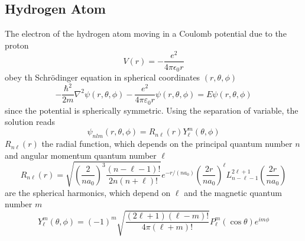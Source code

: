 \documentclass[../../../main.tex]{subfiles}
\begin{document}
  \subsection{Hydrogen Atom}
  The electron of the hydrogen atom  moving in a Coulomb potential due to the proton
  \begin{equation*}
    V(r) = - \frac{e^2}{4 \pi \epsilon_0 r}
  \end{equation*}
  obey th Schrödinger equation in spherical coordinates $(r,\theta,\phi)$
  \begin{equation*}
    -\frac{\hbar^{2}}{2m}\nabla^{2}\psi(r, \theta, \phi) - \frac{e^{2}}{4\pi\varepsilon_{0}r}\psi(r, \theta, \phi) = E\psi(r, \theta, \phi)
  \end{equation*}
  since the potential is spherically symmetric.
  Using the separation of variable, the solution reads
  \begin{equation*}
    \psi_{nlm}(r, \theta, \phi) = R_{n\ell}(r) Y_{\ell}^{m}(\theta, \phi)
  \end{equation*}
$R_{n\ell}(r)$ the radial function, which depends on the principal quantum number $n$ and angular momentum quantum number $\ell$
  \begin{equation*}
    R_{n\ell}(r) = \sqrt{\left( \frac{2}{na_0} \right)^3 \frac{(n-\ell-1)!}{2n(n+\ell)!}} e^{-r/(na_0)} \left( \frac{2r}{na_0} \right)^{\ell} L_{n-\ell-1}^{2\ell+1} \left( \frac{2r}{na_0} \right)
  \end{equation*}
  are the spherical harmonics, which depend on $\ell$ and the magnetic quantum number $m$
  \begin{equation*}
    Y_{\ell}^{m}(\theta, \phi) = (-1)^{m} \sqrt{\frac{(2\ell + 1)(\ell - m)!}{4\pi (\ell + m)!}} P_{\ell}^{m}(\cos \theta)e^{im\phi}
  \end{equation*}
\end{document}
